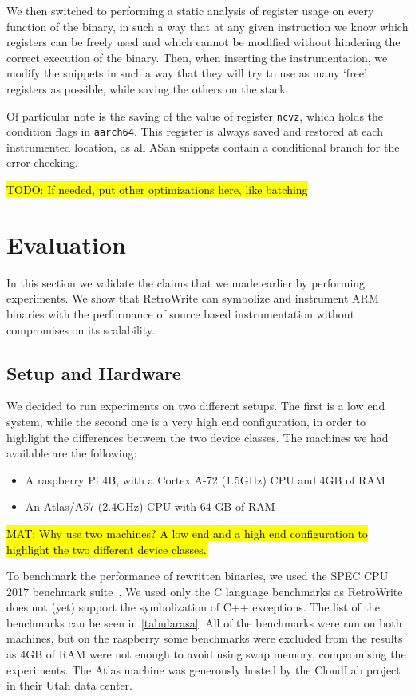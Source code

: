 \documentclass[a4paper,11pt,oneside]{report}
\newcommand{\sysname}{RetroWrite\xspace}
\DeclareRobustCommand{\todo}[1]{{\sethlcolor{cyan}\hl{TODO: #1}}}
\DeclareRobustCommand{\mat}[1]{{\sethlcolor{red}\hl{MAT: #1}}}
\begin{document}
We then switched to performing a static analysis of register usage on every 
function of the binary, in such a way that at any given instruction we know 
which registers can be freely used and which cannot be modified without 
hindering the correct execution of the binary. Then, when inserting the 
instrumentation, we modify the snippets in such a way that they will try to use 
as many `free' registers as possible, while saving the others on the stack.

Of particular note is the saving of the value of register \texttt{ncvz}, which 
holds the condition flags in \texttt{aarch64}. This register is always saved 
and restored at each instrumented location, as all ASan snippets contain a 
conditional branch for the error checking. 

\todo{If needed, put other optimizations here, like batching}


\chapter{Evaluation}


In this section we validate the claims that we made earlier by performing experiments.
We show that \sysname can symbolize and instrument ARM binaries with the performance of
source based instrumentation without compromises on its scalability.

\section{Setup and Hardware} 
We decided to run experiments on two different setups. The first is a low end system, while
the second one is a very high end configuration, in order to highlight the differences between
the two device classes. 
The machines we had available are the following:
\begin{itemize}
	\item A raspberry Pi 4B, with a Cortex A-72 (1.5GHz) CPU and 4GB of RAM
	\item An Atlas/A57 (2.4GHz) CPU with 64 GB of RAM
\end{itemize}

\mat{Why use two machines? A low end and a high end configuration to highlight the two different
device classes.}

To benchmark the performance of rewritten binaries, we used the SPEC CPU 2017
benchmark suite~\cite{speccpu2017}.  We used only the C language benchmarks as
\sysname does not (yet) support the symbolization of C++ exceptions. The list of the
benchmarks can be seen in \autoref{tabularasa}.  All of the benchmarks were run on
both machines, but on the raspberry some benchmarks were excluded from the results
as 4GB of RAM were not enough to avoid using swap memory, compromising the
experiments. The Atlas machine was generously hosted by the
CloudLab project~\cite{cloudlab} in their Utah data center. 
\end{document}
